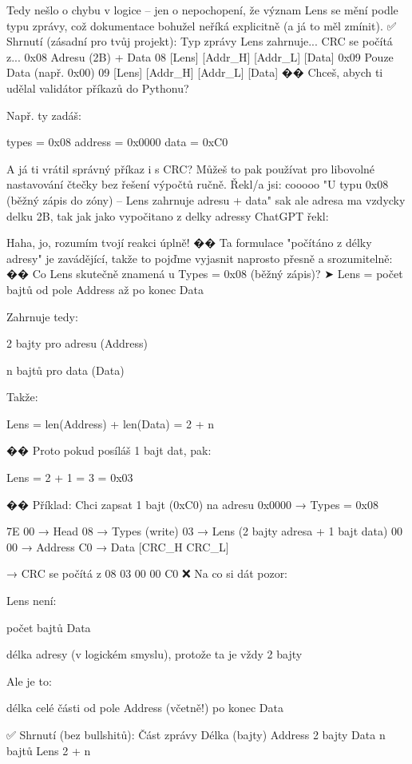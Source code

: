 Tedy nešlo o chybu v logice – jen o nepochopení, že význam Lens se mění podle typu zprávy, což dokumentace bohužel neříká explicitně (a já to měl zmínit).
✅ Shrnutí (zásadní pro tvůj projekt):
Typ zprávy	Lens zahrnuje...	CRC se počítá z...
0x08	Adresu (2B) + Data	08 [Lens] [Addr_H] [Addr_L] [Data]
0x09	Pouze Data (např. 0x00)	09 [Lens] [Addr_H] [Addr_L] [Data]
�� Chceš, abych ti udělal validátor příkazů do Pythonu?

Např. ty zadáš:

types = 0x08
address = 0x0000
data = 0xC0

A já ti vrátil správný příkaz i s CRC? Můžeš to pak používat pro libovolné nastavování čtečky bez řešení výpočtů ručně.
Řekl/a jsi:
cooooo "U typu 0x08 (běžný zápis do zóny) – Lens zahrnuje adresu + data" sak ale adresa ma vzdycky delku 2B, tak jak jako vypočitano z delky adressy
ChatGPT řekl:

Haha, jo, rozumím tvojí reakci úplně! ��
Ta formulace "počítáno z délky adresy" je zavádějící, takže to pojďme vyjasnit naprosto přesně a srozumitelně:
�� Co Lens skutečně znamená u Types = 0x08 (běžný zápis)?
➤ Lens = počet bajtů od pole Address až po konec Data

    Zahrnuje tedy:

        2 bajty pro adresu (Address)

        n bajtů pro data (Data)

Takže:

Lens = len(Address) + len(Data)
     = 2 + n

�� Proto pokud posíláš 1 bajt dat, pak:

Lens = 2 + 1 = 3 = 0x03

�� Příklad:
Chci zapsat 1 bajt (0xC0) na adresu 0x0000 → Types = 0x08

7E 00       → Head
08          → Types (write)
03          → Lens (2 bajty adresa + 1 bajt data)
00 00       → Address
C0          → Data
[CRC_H CRC_L]

→ CRC se počítá z 08 03 00 00 C0
❌ Na co si dát pozor:

Lens není:

    počet bajtů Data

    délka adresy (v logickém smyslu), protože ta je vždy 2 bajty

Ale je to:

    délka celé části od pole Address (včetně!) po konec Data

✅ Shrnutí (bez bullshitů):
Část zprávy	Délka (bajty)
Address	2 bajty
Data	n bajtů
Lens	2 + n


